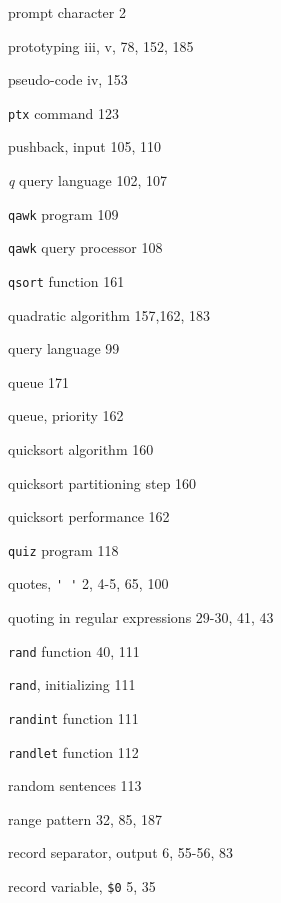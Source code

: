 \begin{multicols}{3}
\hangindent=3pc  prompt character 2

\hangindent=3pc  prototyping iii, v, 78, 152, 185

\hangindent=3pc  pseudo-code iv, 153

\hangindent=3pc  \verb'ptx' command 123

\hangindent=3pc  pushback, input 105, 110

\hangindent=3pc  \textit{q} query language 102, 107

\hangindent=3pc  \verb'qawk' program 109

\hangindent=3pc  \verb'qawk' query processor 108

\hangindent=3pc  \verb'qsort' function 161

\hangindent=3pc  quadratic algorithm 157,162, 183

\hangindent=3pc  query language 99

\hangindent=3pc  queue 171

\hangindent=3pc  queue, priority 162

\hangindent=3pc  quicksort algorithm 160

\hangindent=3pc  quicksort partitioning step 160

\hangindent=3pc  quicksort performance 162

\hangindent=3pc  \verb'quiz' program 118

\hangindent=3pc  quotes, \verb"' '" 2, 4-5, 65, 100

\hangindent=3pc  quoting in regular expressions 29-30, 41, 43

\hangindent=3pc  \verb'rand' function 40, 111

\hangindent=3pc  \verb'rand', initializing 111

\hangindent=3pc  \verb'randint' function 111

\hangindent=3pc  \verb'randlet' function 112

\hangindent=3pc  random sentences 113

\hangindent=3pc  range pattern 32, 85, 187

\hangindent=3pc  record separator, output 6, 55-56, 83

\hangindent=3pc  record variable, \verb'$0' 5, 35


\end{multicols}
